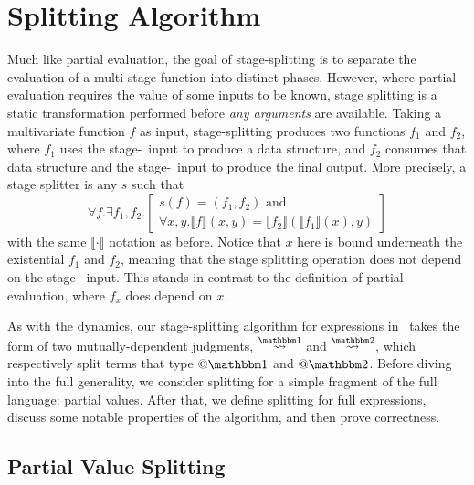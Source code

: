 
\section{Splitting Algorithm}
\label{sec:splitting}

Much like partial evaluation, the goal of stage-splitting is to separate the evaluation of a multi-stage function into distinct phases.
However, where partial evaluation requires the value of some inputs to be known, stage splitting is a static transformation performed
before {\em any arguments} are available.
Taking a multivariate function $f$ as input, stage-splitting produces two functions $f_1$ and $f_2$,
where $f_1$ uses the stage-\bbone\ input to produce a data structure, 
and $f_2$ consumes that data structure and the stage-\bbtwo\ input to produce the final output.  
More precisely, a stage splitter is any $s$ such that
\[
	\forall f. \exists f_1,f_2. 
	\left[
		\begin{array}{l}
		s(f) = (f_1,f_2) \text{ and } \\
		\forall x,y.\llbracket f \rrbracket(x,y)=\llbracket f_2 \rrbracket(\llbracket f_1 \rrbracket(x),y)
		\end{array}
	\right]
\]
with the same $\llbracket \cdot \rrbracket$ notation as before.
Notice that $x$ here is bound underneath the existential $f_1$ and $f_2$,
meaning that the stage splitting operation does not depend on the stage-\bbone\ input.
This stands in contrast to the definition of partial evaluation, where $f_x$ does depend on $x$.

As with the dynamics, our stage-splitting algorithm for expressions in \lang\ takes 
the form of two mutually-dependent judgments, $\splitonesym$ and $\splittwosym$, 
which respectively split terms that type $@ \bbone$ and $@ \bbtwo$. 
Before diving into the full generality, we consider splitting for a simple fragment of the full language: partial values.
After that, we define splitting for full expressions, discuss some notable properties of the algorithm, and then prove correctness.

\subsection{Partial Value Splitting}



